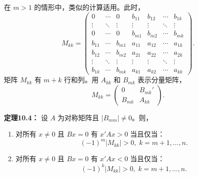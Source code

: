 \begin{translation}
在 $m > 1$ 的情形中，类似的计算适用。此时，
\[
M_{kk} = \begin{pmatrix}
0 & \cdots & 0 & b_{11} & b_{12} & \cdots & b_{1k} \\
\vdots & \ddots & \vdots & \vdots & \vdots & \ddots & \vdots \\
0 & \cdots & 0 & b_{m1} & b_{m2} & \cdots & b_{mk} \\
b_{11} & \cdots & b_{m1} & a_{11} & a_{12} & \cdots & a_{1k} \\
b_{12} & \cdots & b_{m2} & a_{21} & a_{22} & \cdots & a_{2k} \\
\vdots & \ddots & \vdots & \vdots & \vdots & \ddots & \vdots \\
b_{1k} & \cdots & b_{mk} & a_{k1} & a_{k2} & \cdots & a_{kk}
\end{pmatrix}.
\]
矩阵 $M_{kk}$ 有 $m+k$ 行和列。用 $A_{kk}$ 和 $B_{mk}$ 表示分量矩阵，
\[
M_{kk} = \begin{pmatrix} 0 & B_{mk}' \\ B_{mk} & A_{kk} \end{pmatrix}.
\]

\textbf{定理10.4：} 设 $A$ 为对称矩阵且 $|B_{mm}| \neq 0$。则，
\begin{enumerate}
\item 对所有 $x \neq 0$ 且 $Bx = 0$ 有 $x'Ax > 0$ 当且仅当：
\[
(-1)^m|M_{kk}| > 0,\; k = m+1, \ldots, n.
\]
\item 对所有 $x \neq 0$ 且 $Bx = 0$ 有 $x'Ax < 0$ 当且仅当：
\[
(-1)^k|M_{kk}| > 0,\; k = m+1, \ldots, n.
\]
\end{enumerate}
\end{translation}

